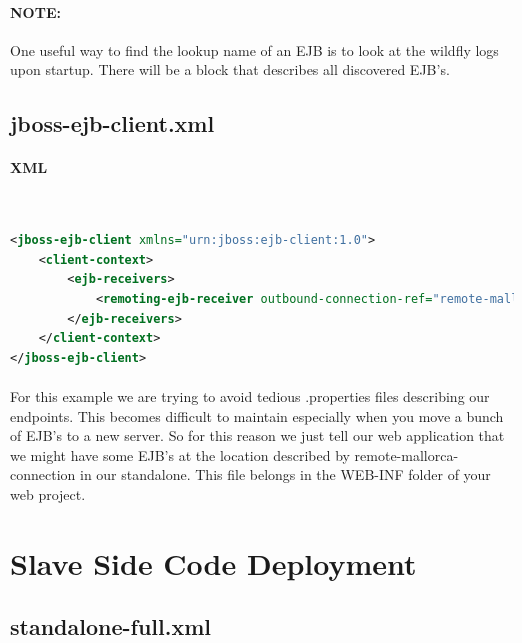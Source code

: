\documentclass[
10pt, %
letterpaper, %
oneside, %
headinclude,footinclude, %
BCOR5mm, %
]{scrartcl}
\begin{document}
\paragraph{\textbf{NOTE:}} One useful way to find the lookup name of an EJB is to look at the wildfly logs upon startup. There will be a block that describes all discovered EJB's.


\subsection{jboss-ejb-client.xml}


\paragraph{XML}~
\begin{lstlisting}[language=XML]
<jboss-ejb-client xmlns="urn:jboss:ejb-client:1.0">
	<client-context>
		<ejb-receivers>
			<remoting-ejb-receiver outbound-connection-ref="remote-mallorca-connection"/>
		</ejb-receivers>
	</client-context>
</jboss-ejb-client>
\end{lstlisting}

\paragraph{} For this example we are trying to avoid tedious .properties files describing our endpoints. This becomes difficult to maintain especially when you move a bunch of EJB's to a new server. So for this reason we just tell our web application that we might have some EJB's at the location described by remote-mallorca-connection in our standalone. This file belongs in the WEB-INF folder of your web project.



\section{Slave Side Code Deployment}



\subsection{standalone-full.xml}
\end{document}
